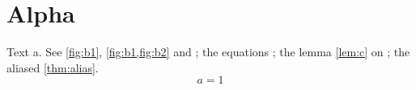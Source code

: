 \chapter{Alpha}\label{ch:a}
Text a. See \cref{fig:b1}, \cref{fig:b1,fig:b2} and ; the equations
; the lemma \cref{lem:c} on ; the aliased
\cref{thm:alias}.
\begin{equation}\label{eq:a}
  a = 1
\end{equation}
